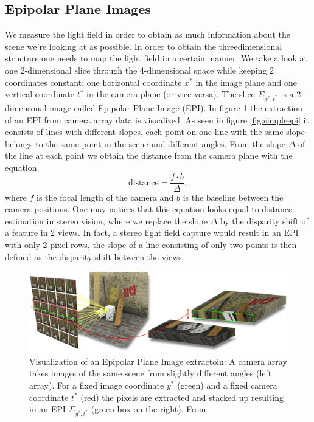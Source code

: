 \documentclass  [
  paper    = a4,
  BCOR     = 10mm,
  twoside,
  fontsize = 12pt,
  fleqn,
  toc      = bibnumbered,
  toc      = listofnumbered,
  numbers  = noendperiod,
  headings = normal,
  listof   = leveldown,
  version  = 3.03
]                                       {scrreprt}
\begin{document}
\subsection{Epipolar Plane Images}
\label{sec:epi}
We measure the light field in order to obtain as much information about the scene we're looking at as possible. In order to obtain the threedimensional structure one needs to map the light field in a certain manner: We take a look at one 2-dimensional slice through the 4-dimensional space while keeping 2 coordinates constant: one horizontal coordinate  $x^{*}$  in the image plane and one vertical coordinate $t^{*}$ in the camera plane (or vice versa). The slice $\Sigma_{x^{*}, t^{*}}$ is a 2-dimensonal image called Epipolar Plane Image (EPI). In figure \ref{fig:epivisualization} the extraction of an EPI from camera array data is visualized. As seen in figure \ref{fig:simpleepi} it consists of lines with different slopes, each point on one line with the same slope belongs to the same point in the scene und different angles. From the slope $\Delta$ of the line at each point we obtain the distance from the camera plane with the equation
\begin{equation}\label{eq:distance}
\text{distance} = \frac{f\cdot b}{\Delta},
\end{equation}
where $f$ is the focal length of the camera and $b$ is the baseline between the camera positions. One may notices that this equation looks equal to distance estimation in stereo vision, where we replace the slope $\Delta$ by the disparity shift of a feature in 2 views. In fact, a stereo light field capture would result in an EPI with only 2 pixel rows, the slope of a line consisting of only two points is then defined as the disparity shift between the views.

\begin{figure}
	\centering
	\includegraphics[width=1\linewidth]{images/epiVisualization}
	\caption[Visualization of an EPI extraction]{Visualization of an Epipolar Plane Image extractoin: A camera array takes images of the same scene from slightly different angles (left array). For a fixed image coordinate $y^*$ (green) and a fixed camera coordinate $t^*$ (red) the pixels are extracted and stacked up resulting in an EPI $\Sigma_{y^*, t^*}$ (green box on the right). From   \cite{iwr.uni-heidelberg.de} }
	\label{fig:epivisualization}
\end{figure}
\end{document}
